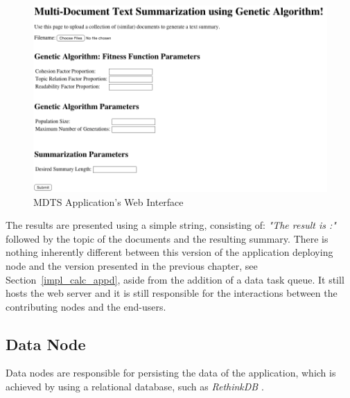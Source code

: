 \documentclass[12pt, titlepage]{uo_temp}
\begin{document}
     \begin{figure}[h!]
       \centering
       \includegraphics[width=125mm]{images/mdts_home.png}
       \caption{MDTS Application's Web Interface}
       \label{mdts_home}
     \end{figure}

     The results are presented using a simple string, consisting of: \emph{"The result
       is :"} followed by the topic of the documents and the resulting summary.
     There is nothing inherently different between this version of the application
     deploying node and the version presented in the previous chapter, see
     Section~\ref{impl_calc_appd}, aside from the addition of a data task queue. It still
     hosts the web server and it is still responsible for the interactions between the
     contributing nodes and the end-users.

     \subsection{Data Node}
     Data nodes are responsible for persisting the data of the application, which is
     achieved by using a relational database, such as \emph{RethinkDB}
     \cite{rethinkdb}.
\end{document}
